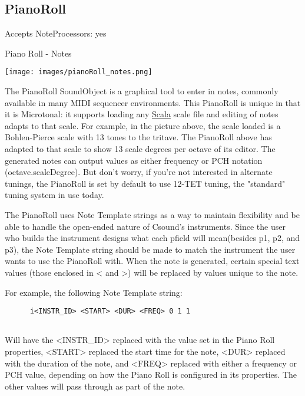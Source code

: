 \subsection{PianoRoll}\label{pianoRoll}

Accepts NoteProcessors: yes

Piano Roll - Notes

\texttt{[image: images/pianoRoll\_notes.png]}

The PianoRoll SoundObject is a graphical tool to enter in notes,
commonly available in many MIDI sequencer environments. This PianoRoll
is unique in that it is Microtonal: it supports loading any
\href{http://www.huygens-fokker.org/scala/}{Scala} scale file and
editing of notes adapts to that scale. For example, in the picture
above, the scale loaded is a Bohlen-Pierce scale with 13 tones to the
tritave. The PianoRoll above has adapted to that scale to show 13 scale
degrees per octave of its editor. The generated notes can output values
as either frequency or PCH notation (octave.scaleDegree). But don't
worry, if you're not interested in alternate tunings, the PianoRoll is
set by default to use 12-TET tuning, the "standard" tuning system in use
today.

The PianoRoll uses Note Template strings as a way to maintain
flexibility and be able to handle the open-ended nature of Csound's
instruments. Since the user who builds the instrument designs what each
pfield will mean(besides p1, p2, and p3), the Note Template string
should be made to match the instrument the user wants to use the
PianoRoll with. When the note is generated, certain special text values
(those enclosed in \textless{} and \textgreater{}) will be replaced by
values unique to the note.

For example, the following Note Template string:

\begin{verbatim}
      i<INSTR_ID> <START> <DUR> <FREQ> 0 1 1
    
\end{verbatim}

Will have the \textless{}INSTR\_ID\textgreater{} replaced with the value
set in the Piano Roll properties, \textless{}START\textgreater{}
replaced the start time for the note, \textless{}DUR\textgreater{}
replaced with the duration of the note, and
\textless{}FREQ\textgreater{} replaced with either a frequency or PCH
value, depending on how the Piano Roll is configured in its properties.
The other values will pass through as part of the note.

